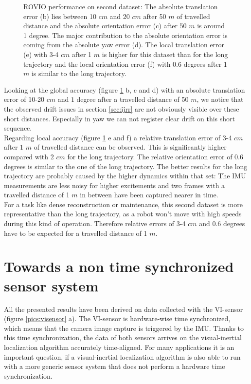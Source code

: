 \begin{figure}[h]
\begin{subfigure}[b]{0.45\textwidth}
    \caption{}
  \end{subfigure}
   \caption{ROVIO performance on second dataset: The absolute translation error (b) lies between 10 $cm$ and 20 $cm$ after 50 $m$ of travelled distance and the absolute orientation error (c) after 50 $m$ is around 1 degree. The major contribution to the absolute orientation error is coming from the absolute yaw error (d). The local translation error (e) with 3-4 $cm$ after 1 $m$ is higher for this dataset than for the long trajectory and the local orientation error (f) with 0.6 degrees after 1 $m$ is similar to the long trajectory.}
   \label{pics:euroc}
\end{figure}

Looking at the global accuracy (figure \ref{pics:euroc} b, c and d) with an absolute translation error of 10-20 $cm$ and $1$ degree after a travelled distance of 50 $m$, we notice that the observed drift issues in section \ref{sec:ijrr} are not obviously visible over these short distances. Especially in yaw we can not register clear drift on this short sequence. \\

Regarding local accuracy (figure \ref{pics:euroc} e and f) a relative translation error of 3-4 $cm$ after 1 $m$ of travelled distance can be observed. This is significantly higher compared with 2 $cm$ for the long trajectory. The relative orientation error of 0.6 degrees is similar to the one of the long trajectory. The better results for the long trajectory are probably caused by the higher dynamics within that set: The IMU measurements are less noisy for higher excitements and two frames with a travelled distance of 1 $m$ in between have been captured nearer in time. \\

For a task like dense reconstruction or maintenance, this second dataset is more representative than the long trajectory, as a robot won't move with high speeds during this kind of operation. Therefore relative errors of 3-4 $cm$ and 0.6 degrees have to be expected for a travelled distance of 1 $m$.

\section{Towards a non time synchronized sensor system}
\label{sec:timesync}

All the presented results have been derived on data collected with the VI-sensor (figure \ref{pics:visensor} a). The VI-sensor is hardware-wise time synchronized, which means that the camera image capture is triggered by the IMU. Thanks to this time synchronization, the data of both sensors arrives on the visual-inertial localization algorithm accurately time-aligned. For many applications it is an important question, if a visual-inertial localization algorithm is also able to run with a more generic sensor system that does not perform a hardware time synchronization. \\

